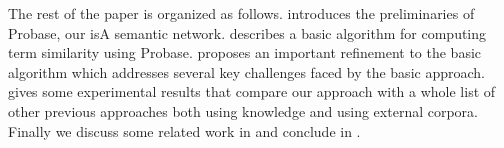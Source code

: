 The rest of the paper is organized as follows.  introduces the preliminaries of Probase, our isA semantic network.
 describes a basic algorithm for computing term similarity using Probase.  proposes an important refinement
to the basic algorithm which addresses several key challenges faced by the basic approach.  gives some experimental results
that compare our approach with a whole list of other previous approaches both using knowledge and using external corpora. Finally we discuss
some related work in  and conclude in .


